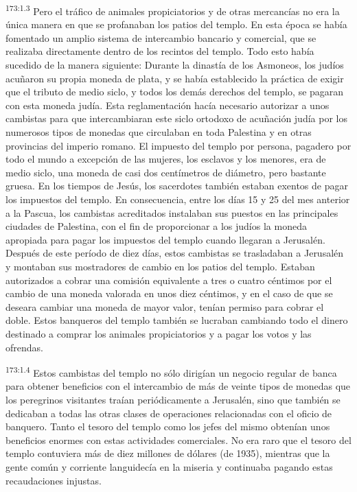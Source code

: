 \par 
\textsuperscript{173:1.3} Pero el tráfico de animales propiciatorios y de otras mercancías no era la única manera en que se profanaban los patios del templo. En esta época se había fomentado un amplio sistema de intercambio bancario y comercial, que se realizaba directamente dentro de los recintos del templo. Todo esto había sucedido de la manera siguiente: Durante la dinastía de los Asmoneos, los judíos acuñaron su propia moneda de plata, y se había establecido la práctica de exigir que el tributo de medio siclo, y todos los demás derechos del templo, se pagaran con esta moneda judía. Esta reglamentación hacía necesario autorizar a unos cambistas para que intercambiaran este siclo ortodoxo de acuñación judía por los numerosos tipos de monedas que circulaban en toda Palestina y en otras provincias del imperio romano. El impuesto del templo por persona, pagadero por todo el mundo a excepción de las mujeres, los esclavos y los menores, era de medio siclo, una moneda de casi dos centímetros de diámetro, pero bastante gruesa. En los tiempos de Jesús, los sacerdotes también estaban exentos de pagar los impuestos del templo. En consecuencia, entre los días 15 y 25 del mes anterior a la Pascua, los cambistas acreditados instalaban sus puestos en las principales ciudades de Palestina, con el fin de proporcionar a los judíos la moneda apropiada para pagar los impuestos del templo cuando llegaran a Jerusalén. Después de este período de diez días, estos cambistas se trasladaban a Jerusalén y montaban sus mostradores de cambio en los patios del templo. Estaban autorizados a cobrar una comisión equivalente a tres o cuatro céntimos por el cambio de una moneda valorada en unos diez céntimos, y en el caso de que se deseara cambiar una moneda de mayor valor, tenían permiso para cobrar el doble. Estos banqueros del templo también se lucraban cambiando todo el dinero destinado a comprar los animales propiciatorios y a pagar los votos y las ofrendas.

\par 
\textsuperscript{173:1.4} Estos cambistas del templo no sólo dirigían un negocio regular de banca para obtener beneficios con el intercambio de más de veinte tipos de monedas que los peregrinos visitantes traían periódicamente a Jerusalén, sino que también se dedicaban a todas las otras clases de operaciones relacionadas con el oficio de banquero. Tanto el tesoro del templo como los jefes del mismo obtenían unos beneficios enormes con estas actividades comerciales. No era raro que el tesoro del templo contuviera más de diez millones de dólares (de 1935), mientras que la gente común y corriente languidecía en la miseria y continuaba pagando estas recaudaciones injustas.

